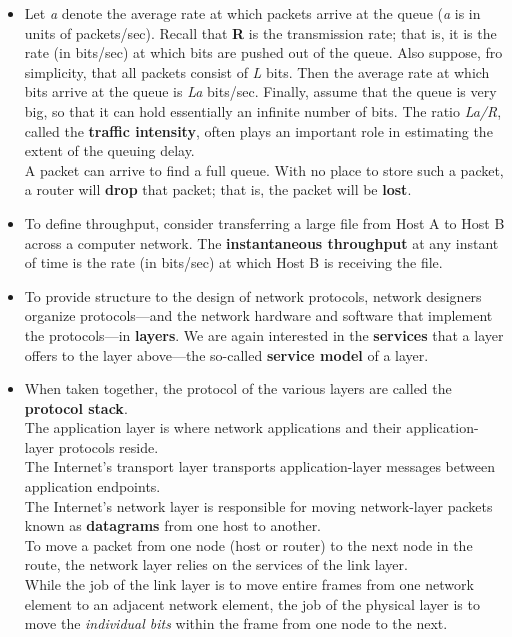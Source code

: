 \begin{itemize}
\item
Let \textit{a} denote the average rate at which packets arrive at the queue (\textit{a} is in units of packets/sec). Recall that \textbf{R} is the transmission rate; that is, it is the rate (in bits/sec) at which bits are pushed out of the queue. Also suppose, fro simplicity, that all packets consist of \textit{L} bits. Then the average rate at which bits arrive at the queue is \textit{La} bits/sec. Finally, assume that the queue is very big, so that it can hold essentially an infinite number of bits. The ratio \textit{La/R}, called the \textbf{traffic intensity}, often plays an important role in estimating the extent of the queuing delay.\\
A packet can arrive to find a full queue. With no place to store such a packet, a router will \textbf{drop} that packet; that is, the packet will be \textbf{lost}.

\item
To define throughput, consider transferring a large file from Host A to Host B across a computer network. The \textbf{instantaneous throughput} at any instant of time is the rate (in bits/sec) at which Host B is receiving the file.

\item
To provide structure to the design of network protocols, network designers organize protocols---and the network hardware and software that implement the protocols---in \textbf{layers}. We are again interested in the \textbf{services} that a layer offers to the layer above---the so-called \textbf{service model} of a layer.

\item
When taken together, the protocol of the various layers are called the \textbf{protocol stack}.\\
The application layer is where network applications and their application-layer protocols reside.\\
The Internet's transport layer transports application-layer messages between application endpoints.\\
The Internet's network layer is responsible for moving network-layer packets known as \textbf{datagrams} from one host to another.\\
To move a packet from one node (host or router) to the next node in the route, the network layer relies on the services of the link layer.\\
While the job of the link layer is to move entire frames from one network element to an adjacent network element, the job of the physical layer is to move the \textit{individual bits} within the frame from one node to the next.


\end{itemize}
